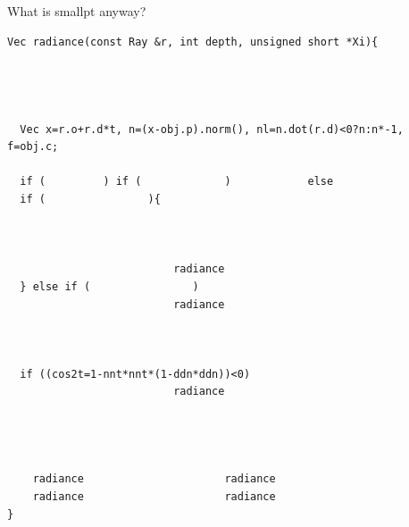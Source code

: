 \documentclass[8pt]{beamer}
\begin{document}
\begin{frame}[fragile]{What is smallpt anyway?}
\footnotesize
\begin{verbatim}
Vec radiance(const Ray &r, int depth, unsigned short *Xi){ 
                                                                      
                                                                      
                                                                   
                                                            
  Vec x=r.o+r.d*t, n=(x-obj.p).norm(), nl=n.dot(r.d)<0?n:n*-1, f=obj.c; 
                                                                         
  if (         ) if (             )            else 
  if (                ){                  
                                                                
                                                                  
                                                                   
                          radiance
  } else if (                )            
                          radiance
                                                                         
                                                                        
                                                                     
  if ((cos2t=1-nnt*nnt*(1-ddn*ddn))<0)
                          radiance
                                                                       
                                                                        
                                                                         
                                                                         
    radiance                      radiance
    radiance                      radiance
} 
\end{verbatim}
\end{frame}
\end{document}
